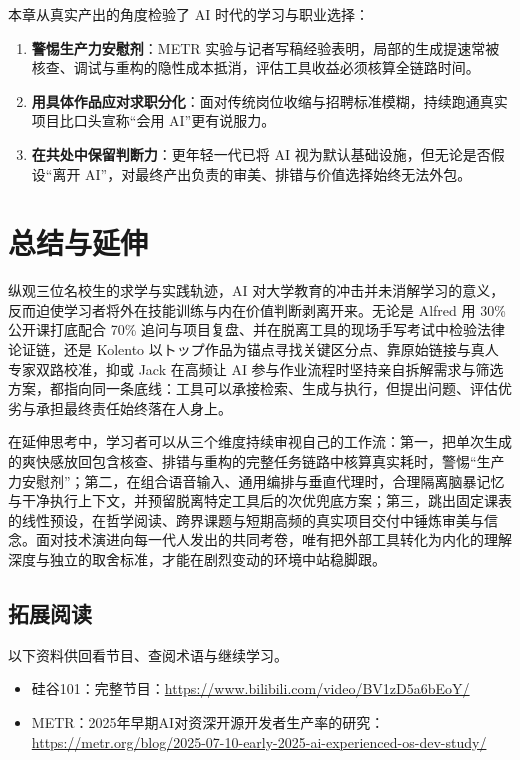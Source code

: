 \documentclass[UTF8,a4paper,11pt,fontset=fandol]{ctexart}
\begin{document}
本章从真实产出的角度检验了 AI 时代的学习与职业选择：
\begin{enumerate}
\item \textbf{警惕生产力安慰剂}：METR 实验与记者写稿经验表明，局部的生成提速常被核查、调试与重构的隐性成本抵消，评估工具收益必须核算全链路时间。
\item \textbf{用具体作品应对求职分化}：面对传统岗位收缩与招聘标准模糊，持续跑通真实项目比口头宣称“会用 AI”更有说服力。
\item \textbf{在共处中保留判断力}：更年轻一代已将 AI 视为默认基础设施，但无论是否假设“离开 AI”，对最终产出负责的审美、排错与价值选择始终无法外包。
\end{enumerate}
\section{总结与延伸}
纵观三位名校生的求学与实践轨迹，AI 对大学教育的冲击并未消解学习的意义，反而迫使学习者将外在技能训练与内在价值判断剥离开来。无论是 Alfred 用 30\% 公开课打底配合 70\% 追问与项目复盘、并在脱离工具的现场手写考试中检验法律论证链，还是 Kolento 以トップ作品为锚点寻找关键区分点、靠原始链接与真人专家双路校准，抑或 Jack 在高频让 AI 参与作业流程时坚持亲自拆解需求与筛选方案，都指向同一条底线：工具可以承接检索、生成与执行，但提出问题、评估优劣与承担最终责任始终落在人身上。

在延伸思考中，学习者可以从三个维度持续审视自己的工作流：第一，把单次生成的爽快感放回包含核查、排错与重构的完整任务链路中核算真实耗时，警惕“生产力安慰剂”；第二，在组合语音输入、通用编排与垂直代理时，合理隔离脑暴记忆与干净执行上下文，并预留脱离特定工具后的次优兜底方案；第三，跳出固定课表的线性预设，在哲学阅读、跨界课题与短期高频的真实项目交付中锤炼审美与信念。面对技术演进向每一代人发出的共同考卷，唯有把外部工具转化为内化的理解深度与独立的取舍标准，才能在剧烈变动的环境中站稳脚跟。
\subsection{拓展阅读}
以下资料供回看节目、查阅术语与继续学习。
\begin{itemize}
\item 硅谷101：完整节目：\url{https://www.bilibili.com/video/BV1zD5a6bEoY/}
\item METR：2025年早期AI对资深开源开发者生产率的研究：\url{https://metr.org/blog/2025-07-10-early-2025-ai-experienced-os-dev-study/}
\end{itemize}
\end{document}
